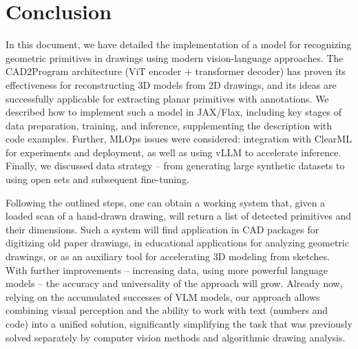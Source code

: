 \documentclass{article}
\begin{document}
\section*{Conclusion}

In this document, we have detailed the implementation of a model for recognizing geometric primitives in drawings using modern vision-language approaches. The CAD2Program architecture (ViT encoder + transformer decoder) has proven its effectiveness for reconstructing 3D models from 2D drawings, and its ideas are successfully applicable for extracting planar primitives with annotations. We described how to implement such a model in JAX/Flax, including key stages of data preparation, training, and inference, supplementing the description with code examples. Further, MLOps issues were considered: integration with ClearML for experiments and deployment, as well as using vLLM to accelerate inference. Finally, we discussed data strategy – from generating large synthetic datasets to using open sets and subsequent fine-tuning.

Following the outlined steps, one can obtain a working system that, given a loaded scan of a hand-drawn drawing, will return a list of detected primitives and their dimensions. Such a system will find application in CAD packages for digitizing old paper drawings, in educational applications for analyzing geometric drawings, or as an auxiliary tool for accelerating 3D modeling from sketches. With further improvements – increasing data, using more powerful language models – the accuracy and universality of the approach will grow. Already now, relying on the accumulated successes of VLM models, our approach allows combining visual perception and the ability to work with text (numbers and code) into a unified solution, significantly simplifying the task that was previously solved separately by computer vision methods and algorithmic drawing analysis.
\end{document}
